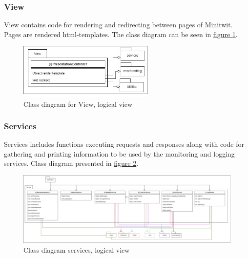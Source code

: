 \subsubsection{View}
View contains code for rendering and redirecting between pages of Minitwit. Pages are rendered html-templates. The class diagram can be seen in \hyperref[fig:classDiagramView]{figure \ref{fig:classDiagramView}}.
\begin{figure}[H]
    \centering
    \includegraphics[width=0.6\textwidth]{images/class_diagram_view.jpg}
    \caption{Class diagram for View, logical view}
    \label{fig:classDiagramView}
\end{figure}

\subsubsection{Services}
Services includes functions executing requests and responses along with code for gathering and printing information to be used by the monitoring and logging services.
Class diagram presented in \hyperref[fig:classDiagramServices]{figure \ref{fig:classDiagramServices}}.
 \begin{figure}[H]
    \centering
    \hspace*{-1.1in}
    \includegraphics[width=1.35\textwidth]{images/class_diagram_services.jpg}
    \caption{Class diagram services, logical view}
    \label{fig:classDiagramServices}
\end{figure}

